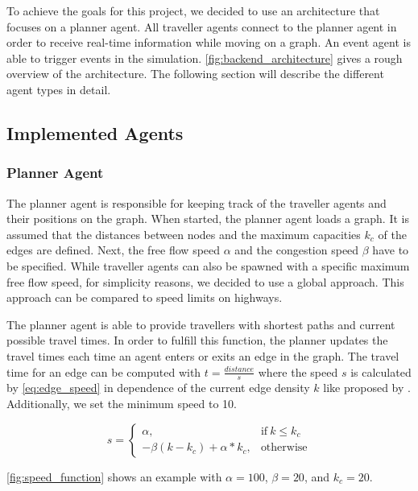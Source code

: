 To achieve the goals for this project, we decided to use an architecture that focuses on a planner agent. All traveller agents connect to the planner agent in order to receive real-time information while moving on a graph. An event agent is able to trigger events in the simulation.
\autoref{fig:backend_architecture} gives a rough overview of the architecture. The following section will describe the different agent types in detail.


\subsection{Implemented Agents}\label{subsec:agents}

\subsubsection{Planner Agent}\label{subsubsec:planner_agent}
The planner agent is responsible for keeping track of the traveller agents and their positions on the graph. When started, the planner agent loads a graph.  It is assumed that the distances between nodes and the maximum capacities $k_{c}$ of the edges are defined. Next, the free flow speed $\alpha$ and the congestion speed $\beta$ have to be specified. While traveller agents can also be spawned with a specific maximum free flow speed, for simplicity reasons, we decided to use a global approach. This approach can be compared to speed limits on highways.

The planner agent is able to provide travellers with shortest paths and current possible travel times.  In order to fulfill this function, the planner updates the travel times each time an agent enters or exits an edge in the graph.
The travel time for an edge can be computed with $ t = \frac{distance}{s} $ where the speed $ s $ is calculated by \autoref{eq:edge_speed} in dependence of the current edge density $k$ like proposed by \cite{mastio2015towards}. Additionally, we set the minimum speed to 10.

\begin{equation}\label{eq:edge_speed}
s = 
\begin{cases}
\alpha, & \text{if}\ k \leq k_{c} \\
-\beta(k - k_{c}) + \alpha*k_{c}, & \text{otherwise}
\end{cases}
\end{equation}

\autoref{fig:speed_function} shows an example with $\alpha = 100$, $\beta=20$, and $k_{c} = 20$.

